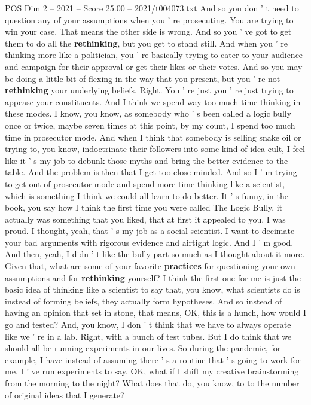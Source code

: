 \begin{textsample}{POS Dim 2 – 2021 – Score 25.00 – 2021/t004073.txt}
And so you don ' t need to question any of your assumptions when you ' re prosecuting.
You are trying to win your case.
That means the other side is wrong.
And so you ' ve got to get them to do all the \textbf{rethinking}, but you get to stand still.
And when you ' re thinking more like a politician, you ' re basically trying to cater to your audience and campaign for their approval or get their likes or their votes.
And so you may be doing a little bit of flexing in the way that you present, but you ' re not \textbf{rethinking} your underlying beliefs.
Right.
You ' re just you ' re just trying to appease your constituents.
And I think we spend way too much time thinking in these modes.
I know, you know, as somebody who ' s been called a logic bully once or twice, maybe seven times at this point, by my count, I spend too much time in prosecutor mode.
And when I think that somebody is selling snake oil or trying to, you know, indoctrinate their followers into some kind of idea cult, I feel like it ' s my job to debunk those myths and bring the better evidence to the table.
And the problem is then that I get too close minded.
And so I ' m trying to get out of prosecutor mode and spend more time thinking like a scientist, which is something I think we could all learn to do better.
It ' s funny, in the book, you say how I think the first time you were called The Logic Bully, it actually was something that you liked, that at first it appealed to you.
I was proud.
I thought, yeah, that ' s my job as a social scientist.
I want to decimate your bad arguments with rigorous evidence and airtight logic.
And I ' m good.
And then, yeah, I didn ' t like the bully part so much as I thought about it more.
Given that, what are some of your favorite \textbf{practices} for questioning your own assumptions and for \textbf{rethinking} yourself?
I think the first one for me is just the basic idea of thinking like a scientist to say that, you know, what scientists do is instead of forming beliefs, they actually form hypotheses.
And so instead of having an opinion that set in stone, that means, OK, this is a hunch, how would I go and tested?
And, you know, I don ' t think that we have to always operate like we ' re in a lab.
Right, with a bunch of test tubes.
But I do think that we should all be running experiments in our lives.
So during the pandemic, for example, I have instead of assuming there ' s a routine that ' s going to work for me, I ' ve run experiments to say, OK, what if I shift my creative brainstorming from the morning to the night?
What does that do, you know, to to the number of original ideas that I generate?

\end{textsample}
